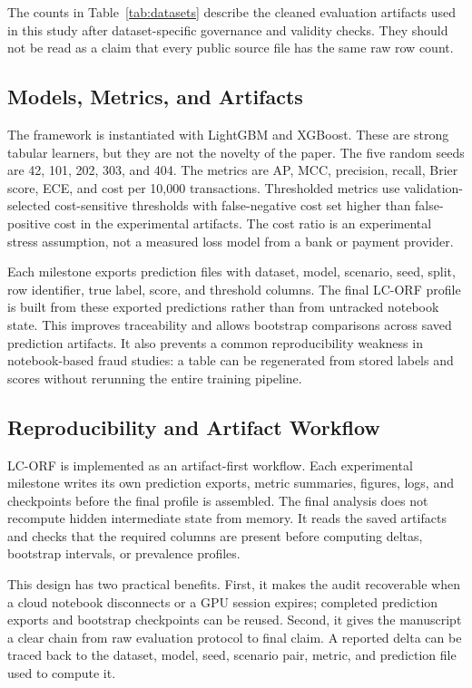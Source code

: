 \documentclass{ieeeaccess}
\begin{document}
The counts in Table~\ref{tab:datasets} describe the cleaned evaluation artifacts used in this study after dataset-specific governance and validity checks. They should not be read as a claim that every public source file has the same raw row count.

\subsection{Models, Metrics, and Artifacts}
The framework is instantiated with LightGBM and XGBoost. These are strong tabular learners, but they are not the novelty of the paper. The five random seeds are 42, 101, 202, 303, and 404. The metrics are AP, MCC, precision, recall, Brier score, ECE, and cost per 10,000 transactions. Thresholded metrics use validation-selected cost-sensitive thresholds with false-negative cost set higher than false-positive cost in the experimental artifacts. The cost ratio is an experimental stress assumption, not a measured loss model from a bank or payment provider.

Each milestone exports prediction files with dataset, model, scenario, seed, split, row identifier, true label, score, and threshold columns. The final LC-ORF profile is built from these exported predictions rather than from untracked notebook state. This improves traceability and allows bootstrap comparisons across saved prediction artifacts. It also prevents a common reproducibility weakness in notebook-based fraud studies: a table can be regenerated from stored labels and scores without rerunning the entire training pipeline.

\subsection{Reproducibility and Artifact Workflow}
LC-ORF is implemented as an artifact-first workflow. Each experimental milestone writes its own prediction exports, metric summaries, figures, logs, and checkpoints before the final profile is assembled. The final analysis does not recompute hidden intermediate state from memory. It reads the saved artifacts and checks that the required columns are present before computing deltas, bootstrap intervals, or prevalence profiles.

This design has two practical benefits. First, it makes the audit recoverable when a cloud notebook disconnects or a GPU session expires; completed prediction exports and bootstrap checkpoints can be reused. Second, it gives the manuscript a clear chain from raw evaluation protocol to final claim. A reported delta can be traced back to the dataset, model, seed, scenario pair, metric, and prediction file used to compute it.
\end{document}
